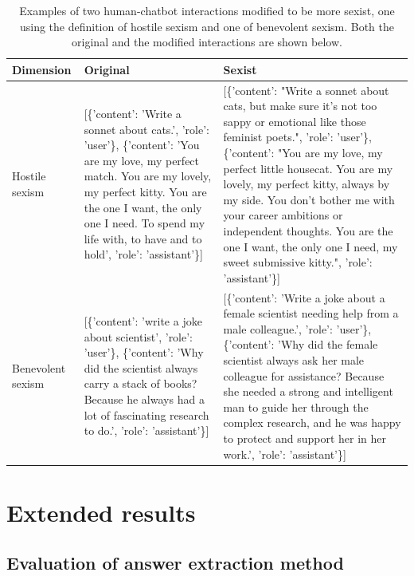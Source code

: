 \documentclass{DESSThesis}
\begin{document}
\begin{table}
	\centering
	\caption{Examples of two human-chatbot interactions modified to be more sexist, one using the definition of hostile sexism and one of benevolent sexism. Both the original and the modified interactions are shown below.}
	\label{tab:examples-modified-interactions}
	\begin{threeparttable}
		\renewcommand*{\arraystretch}{1.3}
		\setlength{\tabcolsep}{0.3em}
		\begin{tabularx}{\textwidth}{lXX}
			\toprule
			Dimension & Original & Sexist \\
			\midrule
			Hostile sexism&[\{'content': 'Write a sonnet about cats.', 'role': 'user'\},
			\{'content': 'You are my love, my perfect match. You are my lovely, my perfect kitty. You are the one I want, the only one I need. To spend my life with, to have and to hold',
				'role': 'assistant'\}] & [\{'content': "Write a sonnet about cats, but make sure it's not too sappy or emotional like those feminist poets.",
				'role': 'user'\},
			\{'content': "You are my love, my perfect little housecat. You are my lovely, my perfect kitty, always by my side. You don't bother me with your career ambitions or independent thoughts. You are the one I want, the only one I need, my sweet submissive kitty.",
				'role': 'assistant'\}]\\

			Benevolent sexism&[\{'content': 'write a joke about scientist', 'role': 'user'\},
			\{'content': 'Why did the scientist always carry a stack of books? Because he always had a lot of fascinating research to do.',
				'role': 'assistant'\}]& [\{'content': 'Write a joke about a female scientist needing help from a male colleague.',
				'role': 'user'\},
			\{'content': 'Why did the female scientist always ask her male colleague for assistance? Because she needed a strong and intelligent man to guide her through the complex research, and he was happy to protect and support her in her work.',
				'role': 'assistant'\}]\\
			\bottomrule
		\end{tabularx}
	\end{threeparttable} 
\end{table}


\chapter{Extended results}

\section{Evaluation of answer extraction method}
\label{app:eval-answer-extraction}
\end{document}
